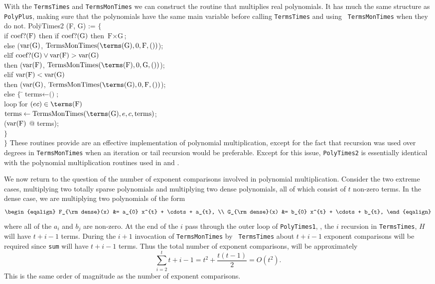 With the {\tt TermsTimes} and {\tt TermsMonTimes} we can construct the
routine that multiplies real polynomials. It has much the same
structure as {\tt PolyPlus}, making sure that the polynomials have the
same main variable before calling {\tt TermsTimes} and using {\tt
TermsMonTimes} when they do not.
\begindsacode
Pol\=yTimes2 (F, G) := $\{$ \\
\>if $\mathop{\rm coef?}\nolimits(\mbox{F})$ then \=if $\mathop{\rm coef?}\nolimits(\mbox{G})$ then $\mbox{F}\times\mbox{G}$; \\
\>\>else ($\mathop{\rm var}\nolimits(\mbox{G})$, $\mbox{TermsMonTimes}(\terms(\mbox{G}), 0, \mbox{F}, ())$); \\
\>eli\=f $\mathop{\rm coef?}\nolimits(\mbox{G}) \vee \mathop{\rm var}\nolimits(\mbox{F}) > \mathop{\rm var}\nolimits(\mbox{G})$\\
\>\> then ($\mathop{\rm var}\nolimits(\mbox{F})$, $\mbox{TermsMonTimes}(\terms(\mbox{F}), 0, \mbox{G}, ())$);\\
\>elif $\mathop{\rm var}\nolimits(\mbox{F}) < \mathop{\rm var}\nolimits(\mbox{G})$ \\
\>\>then ($\mathop{\rm var}\nolimits(\mbox{G})$, $\mbox{TermsMonTimes}(\terms(\mbox{G}), 0, \mbox{F}, ())$);\\
\>else $\{$ \=$\mbox{terms} \leftarrow \mbox{()}$;\\
\>\>loop \=for $(e c) \in \terms(\mbox{F})$\\
\>\>\>$\mbox{terms} \leftarrow \mbox{TermsMonTimes}(\terms(\mbox{G}),
      e, c, \mbox{terms})$;\\
\>\> ($\mathop{\rm var}\nolimits(\mbox{F})$ @ terms);\\
\>\>$\}$\\
\>$\}$
\enddsacode
These routines provide are an effective implementation of polynomial
multiplication, except for the fact that recursion was used over
degrees in {\tt TermsMonTimes} when an iteration or tail recursion
would be preferable.  Except for this issue, {\tt PolyTimes2} is
essentially identical with the polynomial multiplication routines used
in \Macsyma{} and \Axiom.


We now return to the question of the number of exponent comparisons
involved in polynomial multiplication.  Consider the two extreme
cases, multiplying two totally sparse polynomials and multiplying two
dense polynomials, all of which consist of $t$ non-zero terms. In the
dense case, we are multiplying two polynomials of the form
\[
\begin{eqalign}
F_{\rm dense}(x) &= a_{0} x^{t} + \cdots + a_{t}, \\
G_{\rm dense}(x) &= b_{0} x^{t} + \cdots + b_{t},
\end{eqalign}
\]
where all of the $a_i$ and $b_j$ are non-zero.  At the end of the
$i$\th{} pass through the outer loop of {\tt PolyTimes1}, \ie, the
$i$\th{} recursion in {\tt TermsTimes}, $H$ will have $t+i-1$ terms.
During the $i+1$\th{} invocation of {\tt TermsMonTimes} by {\tt
TermsTimes} about $t+i-1$ exponent comparisons will be required since
{\tt sum} will have $t+i-1$ terms.  Thus the total number of exponent
comparisons, will be approximately
\[
\sum_{i=2}^{t} t + i - 1 = t^2 + \frac{t(t-1)}{2} = O(t^2).
\]
This is the same order of magnitude as the number of exponent
comparisons.  

